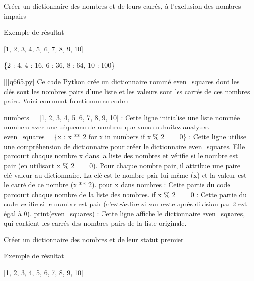         \question
        Créer un dictionnaire des nombres et de leurs carrés, à l'exclusion des nombres impairs

Exemple de résultat

[1, 2, 3, 4, 5, 6, 7, 8, 9, 10]

\{2 : 4, 4 : 16, 6 : 36, 8 : 64, 10 : 100\}
        \par
        \begin{solution}
            \renewcommand{\nomfichier}{q665.py}
            \pythonfile{\chemincode \nomfichier}[][\nomfichier]
            Ce code Python crée un dictionnaire nommé even\_squares dont les clés sont les nombres pairs d'une liste et les valeurs sont les carrés de ces nombres pairs. Voici comment fonctionne ce code :

    numbers = [1, 2, 3, 4, 5, 6, 7, 8, 9, 10] : Cette ligne initialise une liste nommée numbers avec une séquence de nombres que vous souhaitez analyser.
    even\_squares = \{x : x ** 2 for x in numbers if x \% 2 == 0\} : Cette ligne utilise une compréhension de dictionnaire pour créer le dictionnaire even\_squares. Elle parcourt chaque nombre x dans la liste des nombres et vérifie si le nombre est pair (en utilisant x \% 2 == 0). Pour chaque nombre pair, il attribue une paire clé-valeur au dictionnaire. La clé est le nombre pair lui-même (x) et la valeur est le carré de ce nombre (x ** 2).
        pour x dans nombres : Cette partie du code parcourt chaque nombre de la liste des nombres.
        if x \% 2 == 0 : Cette partie du code vérifie si le nombre est pair (c'est-à-dire si son reste après division par 2 est égal à 0).
    print(even\_squares) : Cette ligne affiche le dictionnaire even\_squares, qui contient les carrés des nombres pairs de la liste originale.
        \end{solution}
        

        \question
        Créer un dictionnaire des nombres et de leur statut premier

Exemple de résultat

[1, 2, 3, 4, 5, 6, 7, 8, 9, 10]

